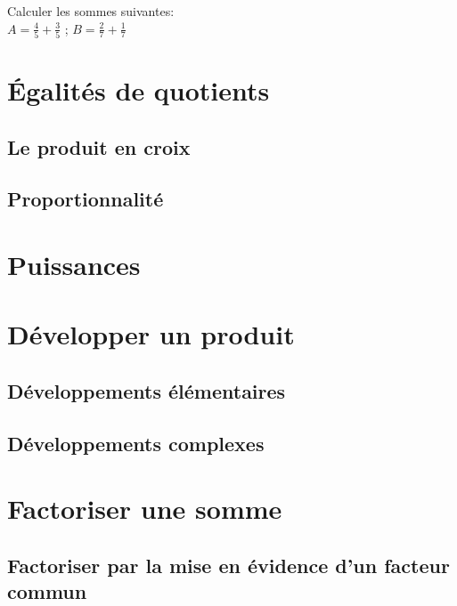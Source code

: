 \documentclass[12pt,a4paper]{report}
\begin{document}
\newpage

\exos
\begin{exo}
Calculer les sommes suivantes:\\
$A=\frac{4}{5}+\frac{3}{5}$ \qquad ; \qquad $B=\frac{2}{7}+\frac{1}{7}$
\end{exo}

\begin{exo}

\end{exo}

\begin{exo}

\end{exo}

\begin{exo}

\end{exo}


\chapter{Égalités de quotients}
\section{Le produit en croix}
\section{Proportionnalité}

\exos

\chapter{Puissances}
\chapter{Développer un produit}
\section{Développements élémentaires}
\section{Développements complexes}

\chapter{Factoriser une somme}
\section{Factoriser par la mise en évidence d'un facteur commun}
\end{document}
